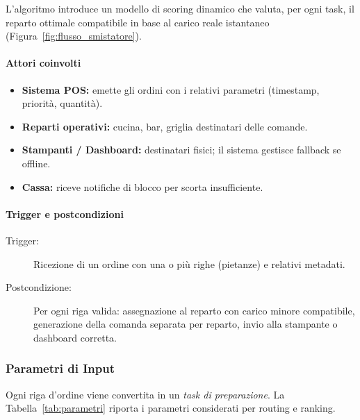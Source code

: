 L'algoritmo introduce un modello di scoring dinamico che valuta, per ogni task, il
reparto ottimale compatibile in base al carico reale istantaneo
(Figura~\ref{fig:flusso_smistatore}).

\paragraph{Attori coinvolti}

\begin{itemize}
    \item \textbf{Sistema POS:} emette gli ordini con i relativi parametri
    (timestamp, priorità, quantità).
    \item \textbf{Reparti operativi:} cucina, bar, griglia destinatari delle
    comande.
    \item \textbf{Stampanti / Dashboard:} destinatari fisici; il sistema gestisce
    fallback se offline.
    \item \textbf{Cassa:} riceve notifiche di blocco per scorta insufficiente.
\end{itemize}

\paragraph{Trigger e postcondizioni}

\begin{description}
    \item[Trigger:] Ricezione di un ordine con una o più righe (pietanze) e
    relativi metadati.
    \item[Postcondizione:] Per ogni riga valida: assegnazione al reparto con carico
    minore compatibile, generazione della comanda separata per reparto, invio alla
    stampante o dashboard corretta.
\end{description}

\subsubsection*{Parametri di Input}

Ogni riga d'ordine viene convertita in un \textit{task di preparazione}. La
Tabella~\ref{tab:parametri} riporta i parametri considerati per routing e ranking.

